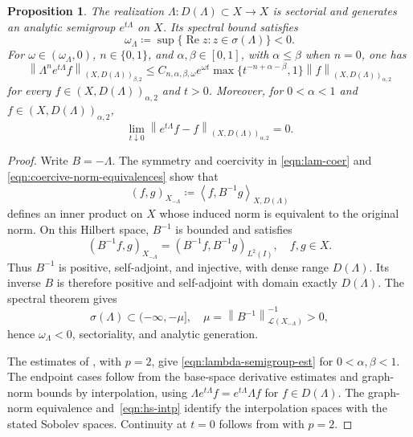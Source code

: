 \documentclass[11pt,reqno]{amsart}
\theoremstyle{plain}
\newtheorem{proposition}[theorem]{Proposition}
\theoremstyle{definition}
\numberwithin{equation}{section}
\newcommand{\mc}[1]{\mathcal{#1}}
\newcommand{\norm}[1]{\left\lVert #1 \right\rVert}
\newcommand{\dual}[2]{\left\langle #1,#2 \right\rangle}
\begin{document}
\begin{proposition}\label{prop:lambda-semigroup}
The realization $\Lambda:D(\Lambda)\subset X\to X$ is sectorial and
generates an analytic semigroup $e^{t\Lambda}$ on $X$. Its spectral bound
satisfies
\begin{equation}
    \omega_\Lambda
    \coloneqq\sup\{\operatorname{Re}z:z\in\sigma(\Lambda)\}<0.
\end{equation}
For $\omega\in(\omega_\Lambda,0)$, $n\in\{0,1\}$, and
$\alpha,\beta\in[0,1]$, with $\alpha\le\beta$ when $n=0$, one has
\begin{equation}\label{eqn:lambda-semigroup-est}
    \norm{\Lambda^n e^{t\Lambda}f}_{(X,D(\Lambda))_{\beta,2}}
    \le C_{n,\alpha,\beta,\omega}e^{\omega t}
    \max\{t^{-n+\alpha-\beta},1\}
    \norm{f}_{(X,D(\Lambda))_{\alpha,2}}
\end{equation}
for every $f\in(X,D(\Lambda))_{\alpha,2}$ and $t>0$.
Moreover, for $0<\alpha<1$ and
$f\in(X,D(\Lambda))_{\alpha,2}$,
\begin{equation}\label{eqn:lambda-semigroup-cont}
    \lim_{t\downarrow0}
    \norm{e^{t\Lambda}f-f}_{(X,D(\Lambda))_{\alpha,2}}=0.
\end{equation}
\end{proposition}
\begin{proof}
Write $B=-\Lambda$. The symmetry and coercivity in
\eqref{eqn:lam-coer} and \eqref{eqn:coercive-norm-equivalences} show that
\begin{equation}\label{eqn:x-lambda-norm}
    (f,g)_{X_{-\Lambda}}
    \coloneqq\dual{f}{B^{-1}g}_{X,D(\Lambda)}
\end{equation}
defines an inner product on $X$ whose induced norm is equivalent to the
original norm.
On this Hilbert space, $B^{-1}$ is bounded and satisfies
\begin{equation*}
    (B^{-1}f,g)_{X_{-\Lambda}}
    =(B^{-1}f,B^{-1}g)_{L^2(I)},
    \quad f,g\in X.
\end{equation*}
Thus $B^{-1}$ is positive, self-adjoint, and injective, with dense range
$D(\Lambda)$. Its inverse $B$ is therefore positive and self-adjoint
with domain exactly $D(\Lambda)$. The spectral theorem gives
\begin{equation*}
    \sigma(\Lambda)\subset(-\infty,-\mu],
    \quad
    \mu=\norm{B^{-1}}_{\mc L(X_{-\Lambda})}^{-1}>0,
\end{equation*}
hence $\omega_\Lambda<0$, sectoriality, and analytic generation.

The estimates of
\cite[Propositions~2.2.2, 2.2.9, and~2.3.1]{Lunardi1995}, with $p=2$,
give \eqref{eqn:lambda-semigroup-est} for $0<\alpha,\beta<1$.
The endpoint cases follow from the base-space derivative estimates and
graph-norm bounds by interpolation, using
$\Lambda e^{t\Lambda}f=e^{t\Lambda}\Lambda f$ for $f\in D(\Lambda)$.
The graph-norm equivalence and~\eqref{eqn:hs-intp} identify the
interpolation spaces with the stated Sobolev spaces. Continuity at $t=0$
follows from \cite[Proposition~2.2.8]{Lunardi1995} with $p=2$.
\end{proof}
\end{document}
